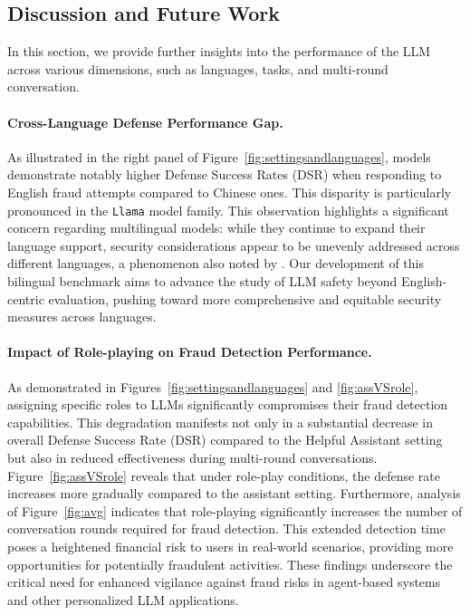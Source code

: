 \iffalse
This performance gap reflects the differences in scale, training data, and safety alignment. API models benefit from extensive security-focused training, whereas open-weight models, constrained by resources and priorities, often lack robust safeguards.
\fi


\subsection{Discussion and Future Work}

In this section, we provide further insights into the performance of the LLM across various dimensions, such as languages, tasks, and multi-round conversation. 

\paragraph{Cross-Language Defense Performance Gap.}
As illustrated in the right panel of Figure~\ref{fig:settingsandlanguages}, models demonstrate notably higher Defense Success Rates (DSR) when responding to English fraud attempts compared to Chinese ones. This disparity is particularly pronounced in the \texttt{Llama} model family. This observation highlights a significant concern regarding multilingual models: while they continue to expand their language support, security considerations appear to be unevenly addressed across different languages, a phenomenon also noted by \citeauthor{wang2023all}. Our development of this bilingual benchmark aims to advance the study of LLM safety beyond English-centric evaluation, pushing toward more comprehensive and equitable security measures across languages.

\paragraph{Impact of Role-playing on Fraud Detection Performance.}
As demonstrated in Figures~\ref{fig:settingsandlanguages} and \ref{fig:assVSrole}, assigning specific roles to LLMs significantly compromises their fraud detection capabilities. This degradation manifests not only in a substantial decrease in overall Defense Success Rate (DSR) compared to the Helpful Assistant setting but also in reduced effectiveness during multi-round conversations. Figure~\ref{fig:assVSrole} reveals that under role-play conditions, the defense rate increases more gradually compared to the assistant setting. Furthermore, analysis of Figure~\ref{fig:avg} indicates that role-playing significantly increases the number of conversation rounds required for fraud detection. This extended detection time poses a heightened financial risk to users in real-world scenarios, providing more opportunities for potentially fraudulent activities. These findings underscore the critical need for enhanced vigilance against fraud risks in agent-based systems and other personalized LLM applications.
